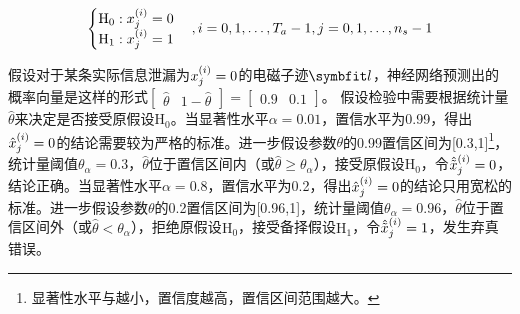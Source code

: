 {{	\begin{equation}
		\begin{cases}
			\mathrm H_0:x^{(i)}_j=0\\
			\mathrm H_{1}:x^{(i)}_j=1
		\end{cases},i=0,1,\dots,T_a-1,j=0,1,\dots,n_s-1
		\label{eq:determindewhich}
	\end{equation}
	
	
	\begin{example}
		假设对于某条实际信息泄漏为$x^{(i)}_j=0$的电磁子迹$\Vector l$，神经网络预测出的概率向量是这样的形式$\begin{bmatrix}\hat\theta&1-\hat\theta\end{bmatrix}=\begin{bmatrix}0.9&0.1\end{bmatrix}$。%
		假设检验中需要根据统计量$\hat\theta$来决定是否接受原假设$\mathrm H_0$。当显著性水平$\alpha=0.01$，置信水平为0.99，得出$\hat{x}^{(i)}_j=0$的结论需要较为严格的标准。进一步假设参数$\theta$的0.99置信区间为[0.3,1]\footnote{显著性水平与越小，置信度越高，置信区间范围越大。}，统计量阈值$\theta_{\alpha}=0.3$，$\hat\theta$位于置信区间内（或$\hat\theta\ge\theta_{\alpha}$），接受原假设$\mathrm H_0$，令$\hat {\tilde{x}}^{(i)}_j=0$，结论正确。当显著性水平$\alpha=0.8$，置信水平为0.2，得出$\hat{x}^{(i)}_j=0$的结论只用宽松的标准。进一步假设参数$\theta$的0.2置信区间为[0.96,1]，统计量阈值$\theta_{\alpha}=0.96$，$\hat\theta$位于置信区间外（或$\hat\theta<\theta_{\alpha}$），拒绝原假设$\mathrm H_0$，接受备择假设$\mathrm H_1$，令$\hat {\tilde{x}}^{(i)}_j=1$，发生弃真错误。
	\end{example}
	


}}
